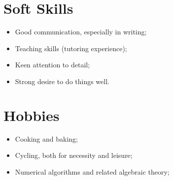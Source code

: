 \documentclass[11pt,a4paper,sans]{moderncv}
\begin{document}
\noindent
\begin{minipage}[t]{0.48\textwidth}  %
\section{Soft Skills}
\begin{itemize}[left=0pt, label=\textbullet]
    \item Good communication, especially in writing;
    \item Teaching skills (tutoring experience);
    \item Keen attention to detail;
    \item Strong desire to do things well.
\end{itemize}
\end{minipage}
\hfill
\begin{minipage}[t]{0.48\textwidth}  %
\section{Hobbies}
\begin{itemize}[left=0pt, label=\textbullet]
    \item Cooking and baking;
    \item Cycling, both for necessity and leisure;
    \item Numerical algorithms and related algebraic theory;
\end{itemize}
\end{minipage}
\end{document}
